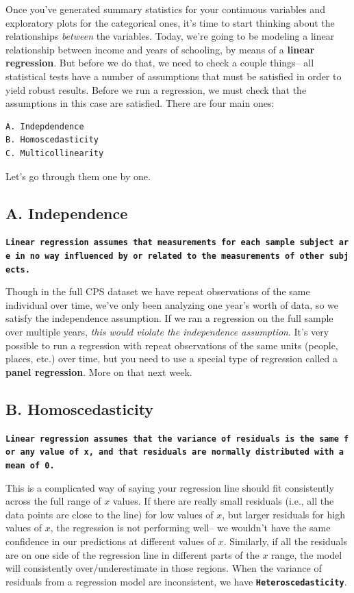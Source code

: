 \documentclass[
  letterpaper,
  DIV=11,
  numbers=noendperiod]{scrreprt}
\begin{document}
Once you've generated summary statistics for your continuous variables
and exploratory plots for the categorical ones, it's time to start
thinking about the relationships \emph{between} the variables. Today,
we're going to be modeling a linear relationship between income and
years of schooling, by means of a \textbf{linear regression}. But before
we do that, we need to check a couple things-- all statistical tests
have a number of assumptions that must be satisfied in order to yield
robust results. Before we run a regression, we must check that the
assumptions in this case are satisfied. There are four main ones:

\begin{verbatim}
A. Indepdendence 
B. Homoscedasticity
C. Multicollinearity 
\end{verbatim}

Let's go through them one by one.

\hypertarget{a.-independence}{%
\subsection{A. Independence}\label{a.-independence}}

\textbf{\texttt{Linear\ regression\ assumes\ that\ measurements\ for\ each\ sample\ subject\ are\ in\ no\ way\ influenced\ by\ or\ related\ to\ the\ measurements\ of\ other\ subjects.}}

Though in the full CPS dataset we have repeat observations of the same
individual over time, we've only been analyzing one year's worth of
data, so we satisfy the independence assumption. If we ran a regression
on the full sample over multiple years, \emph{this would violate the
independence assumption}. It's very possible to run a regression with
repeat observations of the same units (people, places, etc.) over time,
but you need to use a special type of regression called a \textbf{panel
regression}. More on that next week.

\hypertarget{b.-homoscedasticity}{%
\subsection{B. Homoscedasticity}\label{b.-homoscedasticity}}

\textbf{\texttt{Linear\ regression\ assumes\ that\ the\ variance\ of\ residuals\ is\ the\ same\ for\ any\ value\ of\ x,\ and\ that\ residuals\ are\ normally\ distributed\ with\ a\ mean\ of\ 0.}}

This is a complicated way of saying your regression line should fit
consistently across the full range of \(x\) values. If there are really
small residuals (i.e., all the data points are close to the line) for
low values of \(x\), but larger residuals for high values of \(x\), the
regression is not performing well-- we wouldn't have the same confidence
in our predictions at different values of \(x\). Similarly, if all the
residuals are on one side of the regression line in different parts of
the \(x\) range, the model will consistently over/underestimate in those
regions. When the variance of residuals from a regression model are
inconsistent, we have \textbf{\texttt{Heteroscedasticity}}.
\end{document}
